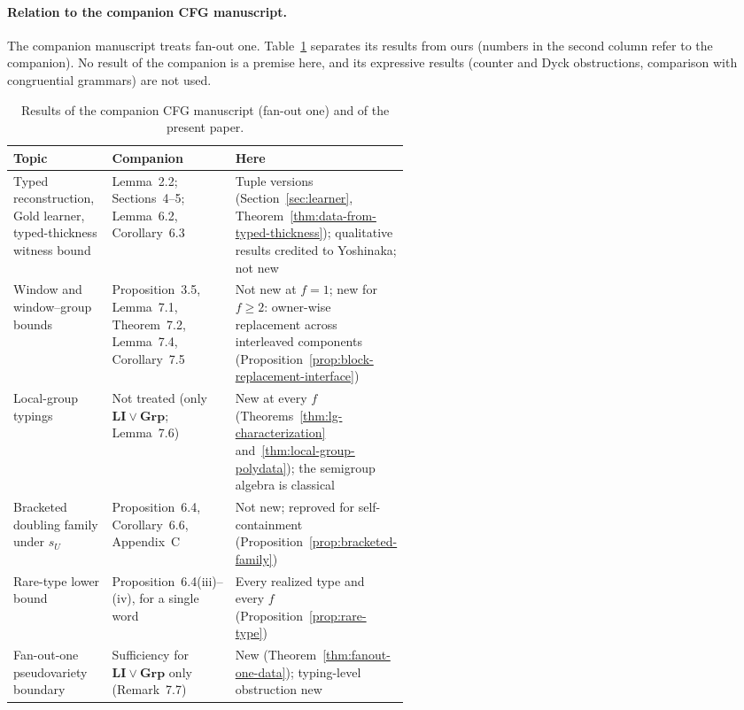 \documentclass[11pt]{article}
\numberwithin{equation}{section}
\theoremstyle{plain}
\theoremstyle{definition}
\theoremstyle{remark}
\begin{document}
\paragraph{Relation to the companion CFG manuscript.}
The companion manuscript \cite{kuriyamaCFG} treats fan-out one.
Table~\ref{tab:companion-overlap} separates its results from ours (numbers in
the second column refer to the companion).  No result of the companion is a
premise here, and its expressive results (counter and Dyck obstructions,
comparison with congruential grammars) are not used.

\begin{table}[htbp]
\caption{Results of the companion CFG manuscript \cite{kuriyamaCFG}
(fan-out one) and of the present paper.}
\label{tab:companion-overlap}
\centering
\footnotesize
\setlength{\tabcolsep}{3pt}
\renewcommand{\arraystretch}{1.15}
\begin{tabularx}{\linewidth}{@{}>{\raggedright\arraybackslash}p{0.27\linewidth}>{\raggedright\arraybackslash}p{0.25\linewidth}>{\raggedright\arraybackslash}X@{}}
\hline
Topic & Companion \cite{kuriyamaCFG} & Here\\
\hline
Typed reconstruction, Gold learner, typed-thickness witness bound
 & Lemma~2.2; Sections~4--5; Lemma~6.2, Corollary~6.3
 & Tuple versions (Section~\ref{sec:learner},
   Theorem~\ref{thm:data-from-typed-thickness}); qualitative results credited to
   Yoshinaka; not new\\
Window and window--group bounds
 & Proposition~3.5, Lemma~7.1, Theorem~7.2, Lemma~7.4, Corollary~7.5
 & Not new at $f=1$; new for $f\ge2$: owner-wise replacement across interleaved
   components (Proposition~\ref{prop:block-replacement-interface})\\
Local-group typings
 & Not treated (only $\mathbf{LI}\vee\mathbf{Grp}$; Lemma~7.6)
 & New at every $f$ (Theorems~\ref{thm:lg-characterization}
   and~\ref{thm:local-group-polydata}); the semigroup algebra is classical\\
Bracketed doubling family under $s_U$
 & Proposition~6.4, Corollary~6.6, Appendix~C
 & Not new; reproved for self-containment (Proposition~\ref{prop:bracketed-family})\\
Rare-type lower bound
 & Proposition~6.4(iii)--(iv), for a single word
 & Every realized type and every $f$ (Proposition~\ref{prop:rare-type})\\
Fan-out-one pseudovariety boundary
 & Sufficiency for $\mathbf{LI}\vee\mathbf{Grp}$ only (Remark~7.7)
 & New (Theorem~\ref{thm:fanout-one-data}); typing-level obstruction new

\end{tabularx}
\end{table}
\end{document}
